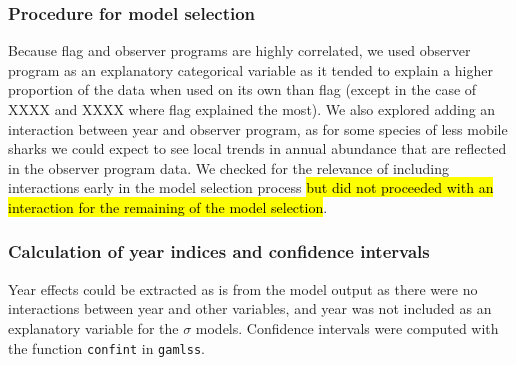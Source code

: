 \subsubsection{Procedure for model selection}




Because flag and observer programs are highly correlated, we used
observer program as an explanatory categorical variable as it tended
to explain a higher proportion of the data when used on its own than
flag (except in the case of XXXX and XXXX where flag explained the most). We also explored adding an interaction between year and observer
program, as for some species of less mobile sharks we could expect to
see local trends in annual abundance that are reflected in the
observer program data. We checked for the relevance of including
interactions early in the model selection process \hl{but did not proceeded with
an interaction for the remaining of the model selection}.




\subsubsection{Calculation of year indices and confidence intervals}
Year effects could be extracted as is from the model output as there were no interactions between year and other variables, and year was not included as an explanatory variable for the $\sigma$ models. Confidence intervals were computed with the function \texttt{confint} in \texttt{gamlss}.



